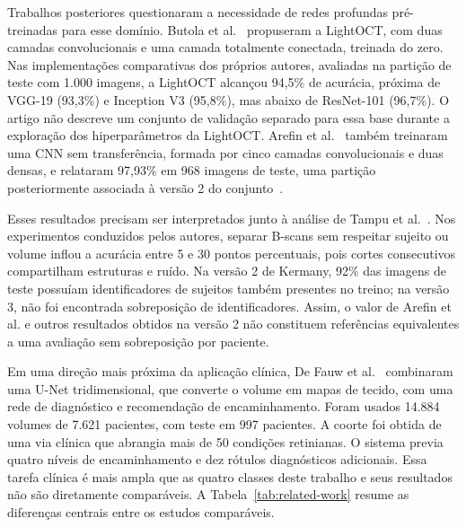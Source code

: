 \documentclass[conference]{IEEEtran}
\begin{document}
Trabalhos posteriores questionaram a necessidade de redes profundas pré-treinadas para esse domínio. Butola et al.~\cite{butola2020} propuseram a LightOCT, com duas camadas convolucionais e uma camada totalmente conectada, treinada do zero. Nas implementações comparativas dos próprios autores, avaliadas na partição de teste com 1.000 imagens, a LightOCT alcançou 94,5\% de acurácia, próxima de VGG-19 (93,3\%) e Inception V3 (95,8\%), mas abaixo de ResNet-101 (96,7\%). O artigo não descreve um conjunto de validação separado para essa base durante a exploração dos hiperparâmetros da LightOCT. Arefin et al.~\cite{arefin2021} também treinaram uma CNN sem transferência, formada por cinco camadas convolucionais e duas densas, e relataram 97,93\% em 968 imagens de teste, uma partição posteriormente associada à versão 2 do conjunto~\cite{tampu2022}.

Esses resultados precisam ser interpretados junto à análise de Tampu et al.~\cite{tampu2022}. Nos experimentos conduzidos pelos autores, separar B-scans sem respeitar sujeito ou volume inflou a acurácia entre 5 e 30 pontos percentuais, pois cortes consecutivos compartilham estruturas e ruído. Na versão 2 de Kermany, 92\% das imagens de teste possuíam identificadores de sujeitos também presentes no treino; na versão 3, não foi encontrada sobreposição de identificadores. Assim, o valor de Arefin et al. e outros resultados obtidos na versão 2 não constituem referências equivalentes a uma avaliação sem sobreposição por paciente.

Em uma direção mais próxima da aplicação clínica, De Fauw et al.~\cite{defauw2018} combinaram uma U-Net tridimensional, que converte o volume em mapas de tecido, com uma rede de diagnóstico e recomendação de encaminhamento. Foram usados 14.884 volumes de 7.621 pacientes, com teste em 997 pacientes. A coorte foi obtida de uma via clínica que abrangia mais de 50 condições retinianas. O sistema previa quatro níveis de encaminhamento e dez rótulos diagnósticos adicionais. Essa tarefa clínica é mais ampla que as quatro classes deste trabalho e seus resultados não são diretamente comparáveis. A Tabela~\ref{tab:related-work} resume as diferenças centrais entre os estudos comparáveis.
\end{document}
